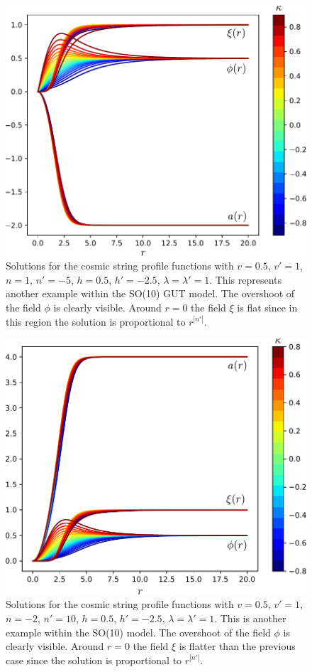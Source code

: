 \begin{figure}
	\centering
	\includegraphics[scale=1]{./figures/F2.pdf}
	
	\caption{Solutions for the cosmic string profile functions with $v = 0.5$, $v'=1$, $n=1$, $n'=-5$, $h=0.5$, $h'=-2.5$, $\lambda=\lambda'=1$. This represents another example within the SO(10) GUT model. The overshoot of the field $\phi$ is clearly visible. Around $r=0$ the field $\xi$ is flat since in this region the solution is proportional to $r^{|n'|}$.}
	\label{fig:fig5}
\end{figure}

\begin{figure}
	\centering
	\includegraphics[scale=1]{./figures/F3.pdf}
	\caption{Solutions for the cosmic string profile functions with $v = 0.5$, $v'=1$, $n=-2$, $n'=10$, $h=0.5$, $h'=-2.5$, $\lambda=\lambda'=1$. This is another example within the SO(10) model. The overshoot of the field $\phi$ is clearly visible. Around $r=0$ the field $\xi$ is flatter than the previous case since the solution is proportional to $r^{|n'|}$.}
	\label{fig:fig6}
\end{figure}

